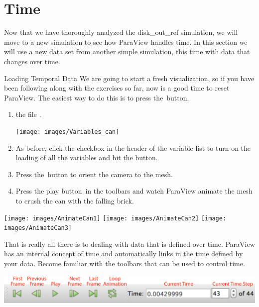 \section{Time}

Now that we have thoroughly analyzed the disk\_out\_ref simulation, we will
move to a new simulation to see how ParaView handles time.  In this section
we will use a new data set from another simple simulation, this time with
data that changes over time.

\begin{exercise}{Loading Temporal Data}
  \label{ex:LoadingTemporalData}%
  We are going to start a fresh visualization, so if you have been
  following along with the exercises so far, now is a good time to reset
  ParaView.  The easiest way to do this is to press the~\disconnect button.

  \begin{enumerate}
  \item {}  the file .
    \begin{inlinefig}
      \texttt{[image: images/Variables\_can]}
    \end{inlinefig}
  \item As before, click the checkbox in the header of the variable list to
    turn on the loading of all the variables and hit the \apply button.
  \item Press the~\yPlus button to orient the camera to the mesh.
  \item Press the play button~\vcrPlay in the toolbars and watch ParaView
    animate the mesh to crush the can with the falling brick.
  \end{enumerate}

  \begin{inlinefig}
    \texttt{[image: images/AnimateCan1]}
    \texttt{[image: images/AnimateCan2]}
    \texttt{[image: images/AnimateCan3]}
  \end{inlinefig}
\end{exercise}

That is really all there is to dealing with data that is defined over time.
ParaView has an internal concept of time and automatically links in the
time defined by your data.  Become familiar with the toolbars that can be
used to control time.

\begin{inlinefig}
  \includegraphics[width=\linewidth]{images/AnimationToolbar}
\end{inlinefig}

